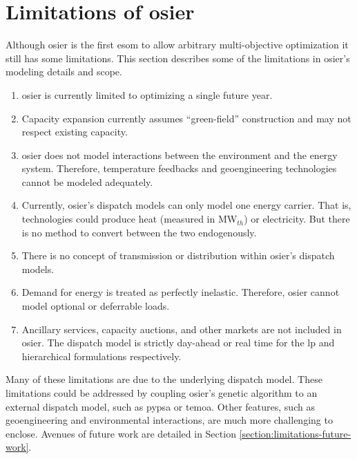 \section{Limitations of \ac{osier}}

Although \ac{osier} is the first \ac{esom} to allow arbitrary multi-objective
optimization it still has some limitations. This section describes some of the limitations in \ac{osier}'s modeling details
and scope.

\begin{enumerate}
    \item \ac{osier} is currently limited to optimizing a single future year.
    \item Capacity expansion currently assumes ``green-field'' construction and
    may not respect existing capacity.
    \item \ac{osier} does not model interactions between the environment and the
    energy system. Therefore, temperature feedbacks and geoengineering
    technologies cannot be modeled adequately. 
    \item Currently, \ac{osier}'s dispatch models can only model one energy carrier. That is, technologies
    could produce heat (measured in MW$_{th}$) or electricity. But there is no method
    to convert between the two endogenously.
    \item There is no concept of transmission or distribution within \ac{osier}'s dispatch
    models. 
    \item Demand for energy is treated as perfectly inelastic. Therefore, \ac{osier} cannot model 
    optional or deferrable loads.
    \item Ancillary services, capacity auctions, and other markets are not included in \ac{osier}. The dispatch
    model is strictly day-ahead or real time for the \ac{lp} and hierarchical formulations respectively.
\end{enumerate}

Many of these limitations are due to the underlying dispatch model. These limitations could be addressed 
by coupling \ac{osier}'s genetic algorithm to an external dispatch model, such as \ac{pypsa} or \ac{temoa}.
Other features, such as geoengineering and environmental interactions, are much more challenging to enclose.
Avenues of future work are detailed in Section \ref{section:limitations-future-work}.

